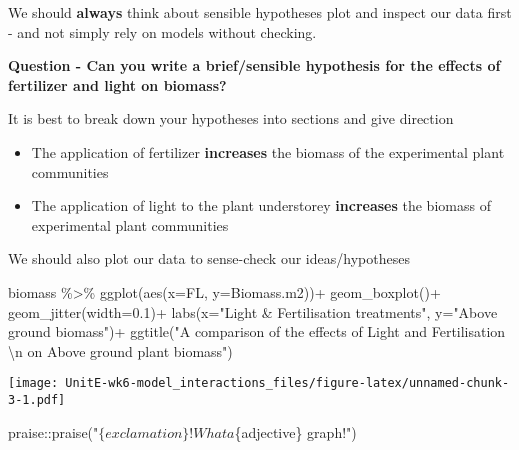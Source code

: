 \documentclass[
]{article}
\newenvironment{Shaded}{\begin{snugshade}}{\end{snugshade}}
\newcommand{\AttributeTok}[1]{\textcolor[rgb]{0.77,0.63,0.00}{#1}}
\newcommand{\FloatTok}[1]{\textcolor[rgb]{0.00,0.00,0.81}{#1}}
\newcommand{\FunctionTok}[1]{\textcolor[rgb]{0.00,0.00,0.00}{#1}}
\newcommand{\NormalTok}[1]{#1}
\newcommand{\SpecialCharTok}[1]{\textcolor[rgb]{0.00,0.00,0.00}{#1}}
\newcommand{\StringTok}[1]{\textcolor[rgb]{0.31,0.60,0.02}{#1}}
\begin{document}
We should \textbf{always} think about sensible hypotheses plot and
inspect our data first - and not simply rely on models without checking.

\textbf{Question - Can you write a brief/sensible hypothesis for the
effects of fertilizer and light on biomass?}

It is best to break down your hypotheses into sections and give
direction

\begin{itemize}
\item
  The application of fertilizer \textbf{increases} the biomass of the
  experimental plant communities
\item
  The application of light to the plant understorey \textbf{increases}
  the biomass of experimental plant communities
\end{itemize}

We should also plot our data to sense-check our ideas/hypotheses

\begin{Shaded}
\begin{Highlighting}[]
\NormalTok{biomass }\SpecialCharTok{\%\textgreater{}\%} 
  \FunctionTok{ggplot}\NormalTok{(}\FunctionTok{aes}\NormalTok{(}\AttributeTok{x=}\NormalTok{FL, }\AttributeTok{y=}\NormalTok{Biomass.m2))}\SpecialCharTok{+}
  \FunctionTok{geom\_boxplot}\NormalTok{()}\SpecialCharTok{+}
  \FunctionTok{geom\_jitter}\NormalTok{(}\AttributeTok{width=}\FloatTok{0.1}\NormalTok{)}\SpecialCharTok{+}
  \FunctionTok{labs}\NormalTok{(}\AttributeTok{x=}\StringTok{"Light \& Fertilisation treatments"}\NormalTok{, }\AttributeTok{y=}\StringTok{"Above ground biomass"}\NormalTok{)}\SpecialCharTok{+}
  \FunctionTok{ggtitle}\NormalTok{(}\StringTok{"A comparison of the effects of Light and Fertilisation }\SpecialCharTok{\textbackslash{}n}\StringTok{ on Above ground plant biomass"}\NormalTok{)}
\end{Highlighting}
\end{Shaded}

\texttt{[image: UnitE-wk6-model\_interactions\_files/figure-latex/unnamed-chunk-3-1.pdf]}

\begin{Shaded}
\begin{Highlighting}[]
\NormalTok{praise}\SpecialCharTok{::}\FunctionTok{praise}\NormalTok{(}\StringTok{"$\{exclamation\}! What a $\{adjective\} graph!"}\NormalTok{)}
\end{Highlighting}
\end{Shaded}
\end{document}
